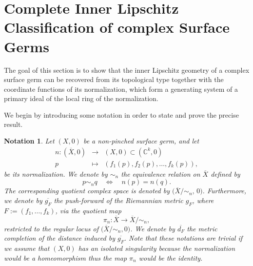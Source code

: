 \documentclass[reqno,dvipsnames,12pt]{amsart}
\newtheorem{nota}[thm]{Notation}
\begin{document}
\section{Complete Inner Lipschitz Classification of complex Surface Germs}
The goal of this section is to show that the inner Lipschitz geometry of a complex surface germ can be recovered from its topological type together with the coordinate functions of its normalization, which form a generating system of a primary ideal of the local ring of the normalization.

We begin by introducing some notation in order to state and prove the precise result.



\begin{nota}\label{quotientmetrique}
Let $(X,0)$ be a non-pinched  surface germ, and let
\[
\begin{array}{ccc}
n:(\overline{X},0) & \longrightarrow & (X,0) \subset (\mathbb{C}^k,0) \\
p & \longmapsto & (f_1(p),f_2(p),\dots,f_k(p)),
\end{array}
\] be its normalization.
We denote by $\sim_n$ the equivalence relation on $\overline{X}$ defined by
$$
p \sim_n q \quad \Longleftrightarrow \quad n(p)=n(q).
$$
The corresponding quotient complex space is denoted by
$\bigl(\overline{X}/\!\sim_n,\,0\bigr)$.
Furthermore, we denote by $\overline{g_F}$
the push-forward of the Riemannian metric $g_F$, where $F:=(f_1,\dots,f_k)$, via the quotient map
$$
\pi_n : \overline{X} \longrightarrow \overline{X}/\!\sim_n,
$$
restricted to the regular locus of $\bigl(\overline{X}/\!\sim_n,0\bigr)$.
We denote by $\overline{d_F}$ the metric completion of the distance induced by
$\overline{g_F}$. Note that these notations are trivial if we assume that $(X,0)$ has an isolated singularity because the normalization would be a homeomorphism thus the map $\pi_n$ would be the identity.
\end{nota}
\end{document}
